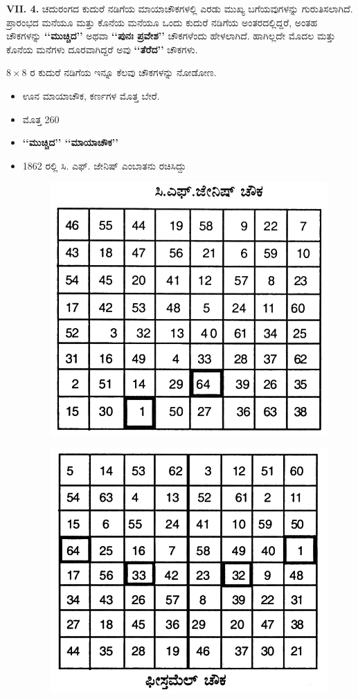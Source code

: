 \textbf{VII. 4.} ಚದುರಂಗದ ಕುದುರೆ ನಡಿಗೆಯ ಮಾಯಾಚೌಕಗಳಲ್ಲಿ ಎರಡು ಮುಖ್ಯ ಬಗೆಯವುಗಳನ್ನು ಗುರುತಿಸಲಾಗಿದೆ. ಪ್ರಾರಂಭದ ಮನೆಯೂ ಮತ್ತು ಕೊನೆಯ ಮನೆಯೂ ಒಂದು ಕುದುರೆ ನಡಿಗೆಯ ಅಂತರದಲ್ಲಿದ್ದರೆ, ಅಂತಹ ಚೌಕಗಳನ್ನು  \textbf{‘‘ಮುಚ್ಚಿದ’’} ಅಥವಾ \textbf{‘‘ಪುನಃ ಪ್ರವೇಶ’’} ಚೌಕಗಳೆಂದು ಹೇಳಲಾಗಿದೆ. ಹಾಗಿಲ್ಲದೇ ಮೊದಲ ಮತ್ತು ಕೊನೆಯ ಮನೆಗಳು ದೂರವಾಗಿದ್ದರೆ ಅವು \textbf{‘‘ತೆರೆದ’’} ಚೌಕಗಳು.

$8 \times 8$ ರ ಕುದುರೆ ನಡಿಗೆಯ ಇನ್ನೂ ಕೆಲವು ಚೌಕಗಳನ್ನು ನೋಡೋಣ.
\begin{itemize}
	\item ಊನ ಮಾಯಾಚೌಕ, ಕರ್ಣಗಳ ಮೊತ್ತ ಬೇರೆ.
	\item ಮೊತ್ತ 260
	\item \textbf{‘‘ಮುಚ್ಚಿದ’’ ‘‘ಮಾಯಾಚೌಕ’’}
	\item 1862 ರಲ್ಲಿ ಸಿ. ಎಫ್. ಜೇನಿಷ್ ಎಂಬಾತನು ರಚಿಸಿದ್ದು
	\begin{figure}[H]
	\includegraphics{src/figures/chap6/fig6.5.jpg}
	\end{figure}
	\begin{figure}[H]
	\includegraphics{src/figures/chap6/fig6.6.jpg}

\end{figure}
\end{itemize}
